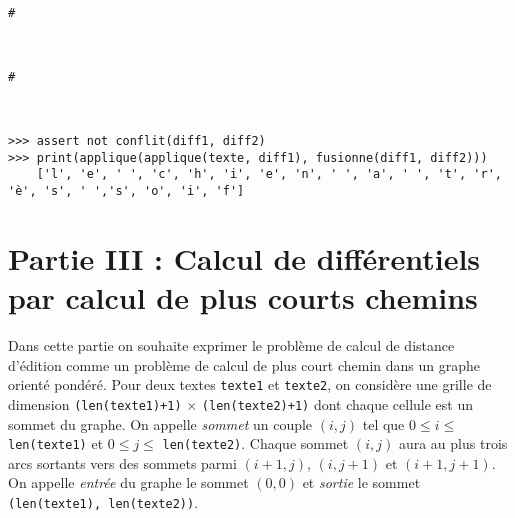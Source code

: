 \ifprof
\begin{corrige}~\\ 
\vspace{-.5cm}
\begin{lstlisting}
#
\end{lstlisting}
\end{corrige}
\else
\fi


\ifprof
\begin{corrige}~\\ 
\vspace{-.5cm}
\begin{lstlisting}
#
\end{lstlisting}
\end{corrige}
\else
\fi


\begin{exemple}~\\ 
\vspace{-.5cm}
\begin{lstlisting}
>>> assert not conflit(diff1, diff2)
>>> print(applique(applique(texte, diff1), fusionne(diff1, diff2)))
    ['l', 'e', ' ', 'c', 'h', 'i', 'e', 'n', ' ', 'a', ' ', 't', 'r', 'è', 's', ' ','s', 'o', 'i', 'f']
\end{lstlisting}
\end{exemple}

\section*{Partie III : Calcul de différentiels par calcul de plus courts chemins}

Dans cette partie on souhaite exprimer le problème de calcul de distance d'édition comme un
problème de calcul de plus court chemin dans un graphe orienté pondéré. Pour deux textes \lstinline{texte1}
et \lstinline{texte2}, on considère une grille de dimension \lstinline{(len(texte1)+1)} $\times$ \lstinline{(len(texte2)+1)} dont chaque
cellule est un sommet du graphe. On appelle \textit{sommet} un couple $(i, j)$ tel que $0\leq i \leq $\lstinline{len(texte1)}
et $0\leq j\leq $ \lstinline{len(texte2)}. Chaque sommet $(i, j)$ aura au plus trois arcs sortants vers des sommets
parmi $(i + 1, j)$, $(i, j + 1)$ et $(i + 1, j + 1)$. On appelle \textit{entrée} du graphe le sommet $(0, 0)$ et \textit{sortie}
le sommet \lstinline{(len(texte1), len(texte2))}.

